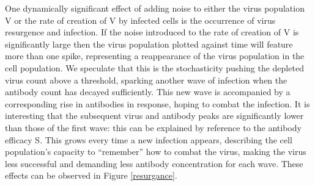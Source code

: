 \documentclass[a4paper, 12pt]{report}
\begin{document}
One dynamically significant effect of adding noise to either the virus population V or the rate of creation of V by infected cells is the occurrence of virus resurgence and infection. If the noise introduced to the rate of creation of V is significantly large then the virus population plotted against time will feature more than one spike, representing a reappearance of the virus population in the cell population. We speculate that this is the stochasticity pushing the depleted virus count above a threshold, sparking another wave of infection when the antibody count has decayed sufficiently. This new wave is accompanied by a corresponding rise in antibodies in response, hoping to combat the infection. It is interesting that the subsequent virus and antibody peaks are significantly lower than those of the first wave: this can be explained by reference to the antibody efficacy S. This grows every time a new infection appears, describing the cell population's capacity to ``remember'' how to combat the virus, making the virus less successful and demanding less antibody concentration for each wave. These effects can be observed in Figure \ref{resurgance}.
\end{document}

